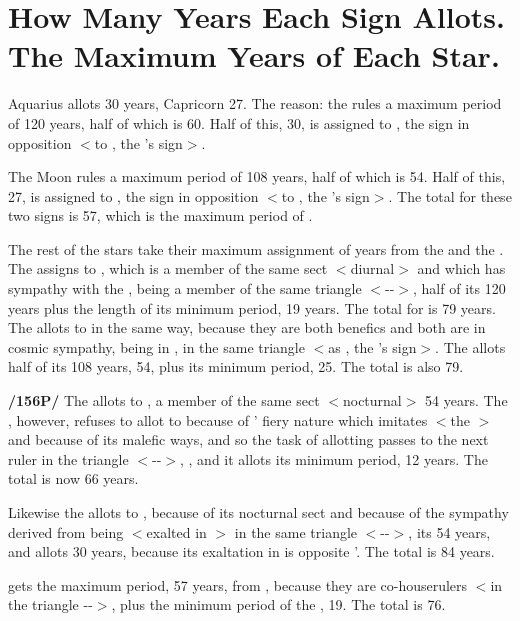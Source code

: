 \section{How Many Years Each Sign Allots. The Maximum Years of Each Star.}

Aquarius allots 30 years, Capricorn 27. The reason: the \Sun\xspace rules a maximum period of 120 years,
half of which is 60. Half of this, 30, is assigned to \Aquarius, the sign in opposition $<$to \Leo, the \Sun’s
sign$>$. 

The Moon rules a maximum period of 108 years, half of which is 54. Half of this, 27, is assigned to \Capricorn, the sign in opposition $<$to \Cancer, the \Moon’s sign$>$. The total for these two signs is 57, which is the maximum period of \Saturn.

The rest of the stars take their maximum assignment of years from the \Sun\xspace and the \Moon. The \Sun\xspace assigns to \Jupiter, which is a member of the same sect $<$diurnal$>$ and which has sympathy with the \Sun, being a member of the same triangle $<$\Leo-\Sagittarius-\Aries$>$, half of its 120 years plus the length of its minimum period, 19 years. The total for \Jupiter\xspace is 79 years. The \Moon\xspace allots to \Jupiter\xspace in the same way, because they are both benefics and both are in cosmic sympathy, \Jupiter\xspace being in \Pisces, in the same triangle $<$as \Cancer, the \Moon’s sign$>$. The \Moon\xspace allots half of its 108 years, 54, plus its minimum period, 25. The total is also 79.

\textbf{/156P/} The \Moon\xspace allots to \Mars, a member of the same sect $<$nocturnal$>$ 54 years. The \Sun, however,
refuses to allot to \Mars\xspace because of \Mars’ fiery nature which imitates $<$the \Sun$>$ and because of its malefic
ways, and so the task of allotting passes to the next ruler in the triangle $<$\Leo-\Sagittarius-\Aries$>$, \Jupiter, and it allots its minimum period, 12 years. The total is now 66 years.

Likewise the \Moon\xspace allots to \Venus, because of its nocturnal sect and because of the sympathy derived from being $<$exalted in \Pisces$>$ in the same triangle $<$\Cancer-\Pisces-\Scorpio$>$, its 54 years, and \Saturn\xspace allots 30 years, because its exaltation in \Libra\xspace is opposite \Venus’. The total is 84 years.

\Mercury\xspace gets the maximum period, 57 years, from \Saturn, because they are co-houserulers $<$in the triangle \Virgo-\Capricorn-\Taurus$>$, plus the minimum period of the \Sun, 19. The total is 76.

\newpage